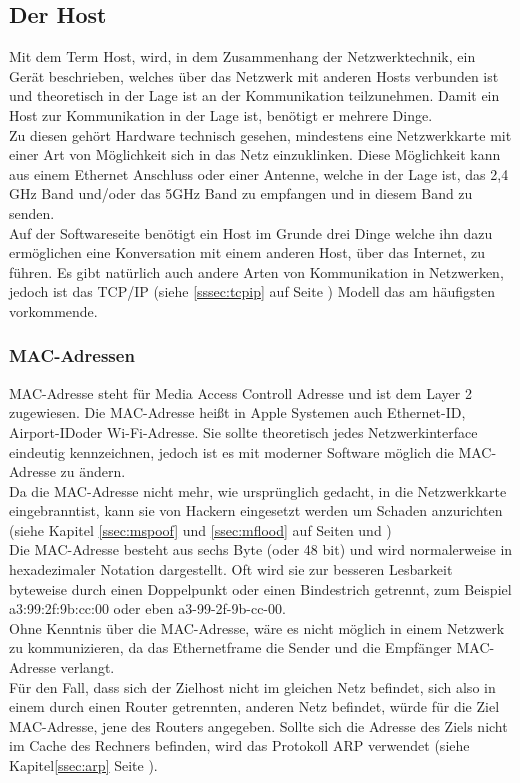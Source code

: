 \documentclass[11pt,a4paper]{report}
\begin{document}
\subsection{Der Host}
Mit dem Term \glqq Host\grqq , wird, in dem Zusammenhang der Netzwerktechnik, ein Gerät beschrieben, welches über das Netzwerk mit anderen Hosts verbunden ist und theoretisch in der Lage ist an der Kommunikation teilzunehmen. Damit ein Host zur Kommunikation in der Lage ist, benötigt er mehrere Dinge.\\
Zu diesen gehört Hardware technisch gesehen, mindestens eine Netzwerkkarte mit einer Art von Möglichkeit sich in das Netz einzuklinken. Diese Möglichkeit kann aus einem Ethernet Anschluss oder einer Antenne, welche in der Lage ist, das 2,4 GHz Band und/oder das 5GHz Band zu empfangen und in diesem Band zu senden.\\
Auf der Softwareseite benötigt ein Host im Grunde drei Dinge welche ihn dazu ermöglichen eine Konversation mit einem anderen Host, über das Internet, zu führen. Es gibt natürlich auch andere Arten von Kommunikation in Netzwerken, jedoch ist das TCP/IP (siehe \ref{sssec:tcpip} auf Seite \pageref{sssec:tcpip}) Modell das am häufigsten vorkommende. 
\subsubsection{MAC-Adressen}
MAC-Adresse steht für Media Access Controll Adresse und ist dem Layer 2 zugewiesen. Die MAC-Adresse heißt in Apple Systemen auch \glqq Ethernet-ID\grqq , \glqq Airport-ID\grqq oder \glqq Wi-Fi-Adresse\grqq . Sie sollte theoretisch jedes Netzwerkinterface eindeutig kennzeichnen, jedoch ist es mit moderner Software möglich die MAC-Adresse zu ändern.\\
Da die MAC-Adresse nicht mehr, wie ursprünglich gedacht, in die Netzwerkkarte \glqq eingebrannt\grqq ist, kann sie von Hackern eingesetzt werden um Schaden anzurichten (siehe Kapitel \ref{ssec:mspoof} und \ref{ssec:mflood} auf Seiten \pageref{ssec:mspoof} und \pageref{ssec:mflood})\\

Die MAC-Adresse besteht aus sechs Byte (oder 48 bit) und wird normalerweise in hexadezimaler Notation dargestellt. Oft wird sie zur besseren Lesbarkeit byteweise durch einen Doppelpunkt oder einen Bindestrich getrennt, zum Beispiel a3:99:2f:9b:cc:00 oder eben a3-99-2f-9b-cc-00.\\

Ohne Kenntnis über die MAC-Adresse, wäre es nicht möglich in einem Netzwerk zu kommunizieren, da das Ethernetframe die Sender und die Empfänger MAC-Adresse verlangt.\\
Für den Fall, dass sich der Zielhost nicht im gleichen Netz befindet, sich also in einem durch einen Router getrennten, anderen Netz befindet, würde für die Ziel MAC-Adresse, jene des Routers angegeben. Sollte sich die Adresse des Ziels nicht im Cache des Rechners befinden, wird das Protokoll ARP verwendet (siehe Kapitel\ref{ssec:arp} Seite \pageref{ssec:arp}). 
\end{document}
